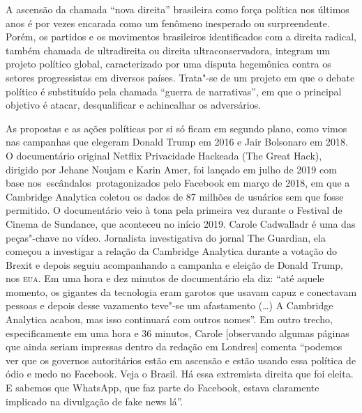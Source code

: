 
\begin{flushright}
\end{flushright}

\noindent{}A ascensão da chamada ``nova direita'' brasileira como força política
nos últimos anos é por vezes encarada como um fenômeno inesperado ou
surpreendente. Porém, os partidos e os movimentos brasileiros
identificados com a direita radical, também chamada de ultradireita ou
direita ultraconservadora, integram um projeto político global,
caracterizado por uma disputa hegemônica contra os setores progressistas
em diversos países. Trata"-se de um projeto em que o debate político é
substituído pela chamada ``guerra de narrativas'', em que o principal
objetivo é atacar, desqualificar e achincalhar os adversários.

As propostas e as ações políticas por si só ficam em segundo plano, como
vimos nas campanhas que elegeram Donald Trump em 2016 e Jair Bolsonaro
em 2018. O documentário original Netflix Privacidade Hackeada (The Great
Hack), dirigido por Jehane Noujam e Karin Amer, foi lançado em julho de
2019 com base nos~escândalos~protagonizados pelo Facebook em março de
2018, em que a Cambridge Analytica coletou os dados de 87 milhões de
usuários sem que fosse permitido. O documentário veio à tona pela
primeira vez durante o Festival de Cinema de Sundance, que aconteceu no
início 2019. Carole Cadwalladr é uma das peças"-chave no vídeo.
Jornalista investigativa do jornal The Guardian, ela começou a
investigar a relação da Cambridge Analytica durante a votação do Brexit
e depois seguiu acompanhando a campanha e eleição de Donald Trump, nos
\textsc{eua}. Em uma hora e dez minutos de documentário ela diz: ``até aquele
momento, os gigantes da tecnologia eram garotos que usavam capuz e
conectavam pessoas e depois desse vazamento teve"-se um afastamento (\ldots{})
A Cambridge Analytica acabou, mas isso continuará com outros nomes''. Em
outro trecho, especificamente em uma hora e 36 minutos, Carole
{[}observando algumas páginas que ainda seriam impressas dentro da
redação em Londres{]} comenta ``podemos ver que os governos autoritários
estão em ascensão e estão usando essa política de ódio e medo no
Facebook. Veja o Brasil. Há essa extremista direita que foi eleita. E
sabemos que WhatsApp, que faz parte do Facebook, estava claramente
implicado na divulgação de fake news lá''.

